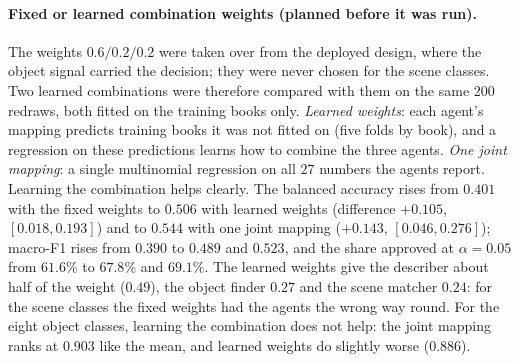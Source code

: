 \paragraph{Fixed or learned combination weights (planned before it was run).} The weights $0.6/0.2/0.2$ were taken over from the deployed design, where the object signal carried the decision; they were never chosen for the scene classes. Two learned combinations were therefore compared with them on the same 200 redraws, both fitted on the training books only. \emph{Learned weights}: each agent's mapping predicts training books it was not fitted on (five folds by book), and a regression on these predictions learns how to combine the three agents. \emph{One joint mapping}: a single multinomial regression on all $27$ numbers the agents report. Learning the combination helps clearly. The balanced accuracy rises from $0.401$ with the fixed weights to $0.506$ with learned weights (difference $+0.105$, $[0.018, 0.193]$) and to $0.544$ with one joint mapping ($+0.143$, $[0.046, 0.276]$); macro-F1 rises from $0.390$ to $0.489$ and $0.523$, and the share approved at $\alpha=0.05$ from $61.6\%$ to $67.8\%$ and $69.1\%$. The learned weights give the describer about half of the weight ($0.49$), the object finder $0.27$ and the scene matcher $0.24$: for the scene classes the fixed weights had the agents the wrong way round. For the eight object classes, learning the combination does not help: the joint mapping ranks at $0.903$ like the mean, and learned weights do slightly worse ($0.886$).

